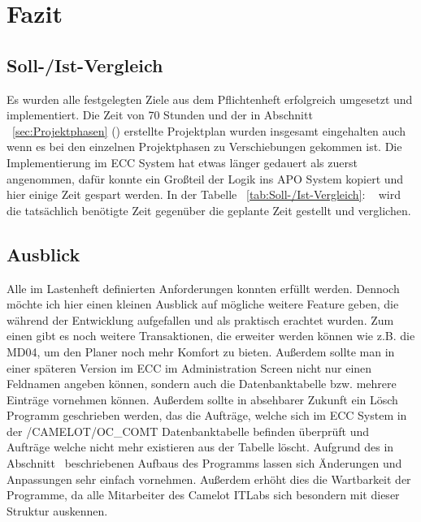 \section{Fazit} 
\label{sec:Fazit}

\subsection{Soll-/Ist-Vergleich}
\label{sec:SollIstVergleich}

Es wurden alle festgelegten Ziele aus dem Pflichtenheft erfolgreich umgesetzt und implementiert. Die Zeit von 70 Stunden und der in Abschnitt ~\ref{sec:Projektphasen} () erstellte Projektplan wurden insgesamt eingehalten auch wenn es bei den einzelnen Projektphasen zu Verschiebungen gekommen ist. Die Implementierung im \ac{ECC} System hat etwas länger gedauert als zuerst angenommen, dafür konnte ein Großteil der Logik ins \ac{APO} System kopiert und hier einige Zeit gespart werden. In der Tabelle ~\ref{tab:Soll-/Ist-Vergleich}: ~ wird die tatsächlich benötigte Zeit gegenüber die geplante Zeit gestellt und verglichen.

\subsection{Ausblick}
\label{sec:Ausblick}
Alle im Lastenheft definierten Anforderungen konnten erfüllt werden. Dennoch möchte ich hier einen kleinen Ausblick auf mögliche weitere Feature geben, die während der Entwicklung aufgefallen und als praktisch erachtet wurden. Zum einen gibt es noch weitere Transaktionen, die erweiter werden können wie z.B. die MD04, um den Planer noch mehr Komfort zu bieten. Außerdem sollte man in einer späteren Version im \ac{ECC} im Administration Screen nicht nur einen Feldnamen angeben können, sondern auch die Datenbanktabelle bzw. mehrere Einträge vornehmen können. Außerdem sollte in absehbarer Zukunft ein Lösch Programm geschrieben werden, das die Aufträge, welche sich im ECC System in der /CAMELOT/OC\_COMT Datenbanktabelle befinden überprüft und Aufträge welche nicht mehr existieren aus der Tabelle löscht. Aufgrund des in Abschnitt~ beschriebenen Aufbaus des Programms lassen sich Änderungen und Anpassungen sehr einfach vornehmen. Außerdem erhöht dies die Wartbarkeit der Programme, da alle Mitarbeiter des Camelot ITLabs sich besondern mit dieser Struktur auskennen. 
